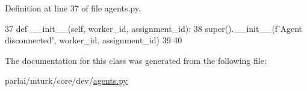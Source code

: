 Definition at line 37 of file agents.\+py.


\begin{DoxyCode}
37     \textcolor{keyword}{def }\_\_init\_\_(self, worker\_id, assignment\_id):
38         super().\_\_init\_\_(f\textcolor{stringliteral}{'Agent disconnected'}, worker\_id, assignment\_id)
39 
40 
\end{DoxyCode}


The documentation for this class was generated from the following file\+:\begin{DoxyCompactItemize}
\item 
parlai/mturk/core/dev/\hyperlink{parlai_2mturk_2core_2dev_2agents_8py}{agents.\+py}\end{DoxyCompactItemize}
